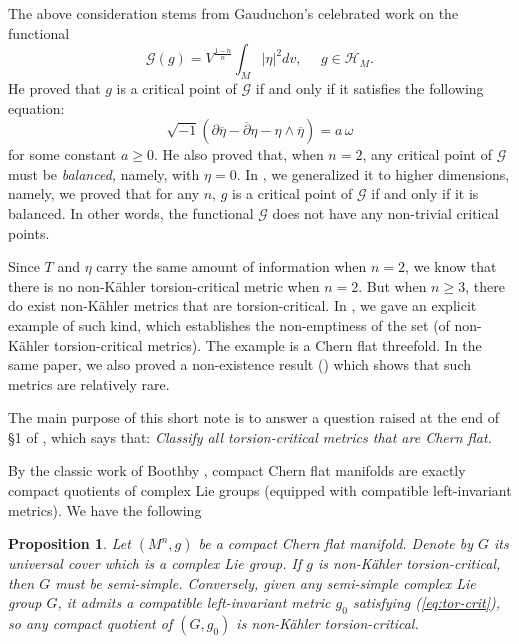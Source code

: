 \documentclass{amsart}
\newtheorem{proposition}{Proposition}
\begin{document}
The above consideration stems from Gauduchon's celebrated work \cite{Gau84} on the functional 
\begin{equation*}
{\mathcal G} (g) = V^{\frac{1-n}{n}} \int_M |\eta|^2 dv, \ \ \ \ \ \ g\in {\mathcal H}_M.
\end{equation*}
He proved that $g$ is a critical point of ${\mathcal G}$ if and only if it satisfies the following equation:
\begin{equation} \label{eq:Gau-crit}
\sqrt{-1} (\partial \overline{\eta} - \overline{\partial} \eta - \eta \wedge \overline{\eta}) = a\, \omega
\end{equation}
for some constant $a \geq 0$. He also proved \cite[Theorem III.4]{Gau84} that, when $n=2$, any critical point of ${\mathcal G}$ must be {\em balanced,} namely, with $\eta=0$. In \cite[Proposition 1]{ZhangZ}, we generalized it to higher dimensions, namely, we proved that for any $n$, $g$ is a critical point of ${\mathcal G}$ if and only if it is balanced. In other words, the functional ${\mathcal G}$ does not have any non-trivial critical points. 

Since $T$ and $\eta$ carry the same amount of information when $n=2$, we know that there is no non-K\"ahler torsion-critical metric when $n=2$. But when $n\geq 3$, there do exist non-K\"ahler metrics that are torsion-critical. In \cite{ZhangZ}, we gave an explicit example of such kind, which establishes the non-emptiness of the set (of non-K\"ahler torsion-critical metrics). The example is a Chern flat threefold. In the same paper, we also proved a non-existence result (\cite[Proposition 4]{ZhangZ}) which shows that such metrics are relatively rare. 

The main purpose of this short note is to answer a question raised at the end of \S 1  of \cite{ZhangZ}, which says that: {\em Classify all torsion-critical metrics that are Chern flat.}

By the classic work of Boothby \cite{Boothby}, compact Chern flat manifolds are exactly compact quotients of complex Lie groups (equipped with  compatible left-invariant metrics). We have the following

\begin{proposition}  \label{prop1}
Let $(M^n,g)$ be a compact Chern flat manifold. Denote by $G$ its universal cover which is a complex Lie group. If $g$ is non-K\"ahler torsion-critical, then $G$ must be semi-simple. Conversely, given any semi-simple complex Lie group $G$, it admits a compatible left-invariant metric $g_0$ satisfying (\ref{eq:tor-crit}), so any compact quotient of $(G,g_0)$ is non-K\"ahler torsion-critical.  
\end{proposition}
\end{document}
